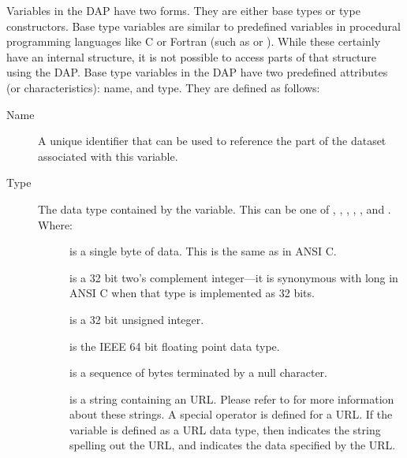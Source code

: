 Variables in the \opendap DAP have two forms. They are either base types
or type constructors. Base type variables are similar to predefined
variables in procedural programming languages like C or Fortran (such
as  or ).  While these certainly have an
internal structure, it is not possible to access parts of that
structure using the DAP\@. Base type variables in the DAP have two
predefined attributes (or characteristics): name, and type.
They are defined as follows:

\begin{description}

\item [Name] A unique identifier that can be used to reference the part of
  the dataset associated with this variable.

\item [Type] The data type contained by the variable. This can be one
of , , , ,
 , and
\@.  Where:

\begin{description}

\item [] is a single byte of data. This is the same as
 in ANSI C\@.

\item [] is a 32 bit two's complement integer---it 
is synonymous with long in ANSI C when that type is implemented as 32
bits.

\item [] is a 32 bit unsigned integer.

\item [] is the IEEE 64 bit floating point data type.

\item [] is a sequence of bytes terminated by a null
character.

\item [] is a string containing an \opendap URL. Please refer to
 for more information about these
strings. A special \lit{*} operator is defined for a URL. If the
variable  is defined as a URL data type, then 
indicates the string spelling out the URL, and  indicates
the data specified by the URL.

\end{description}


\end{description}

